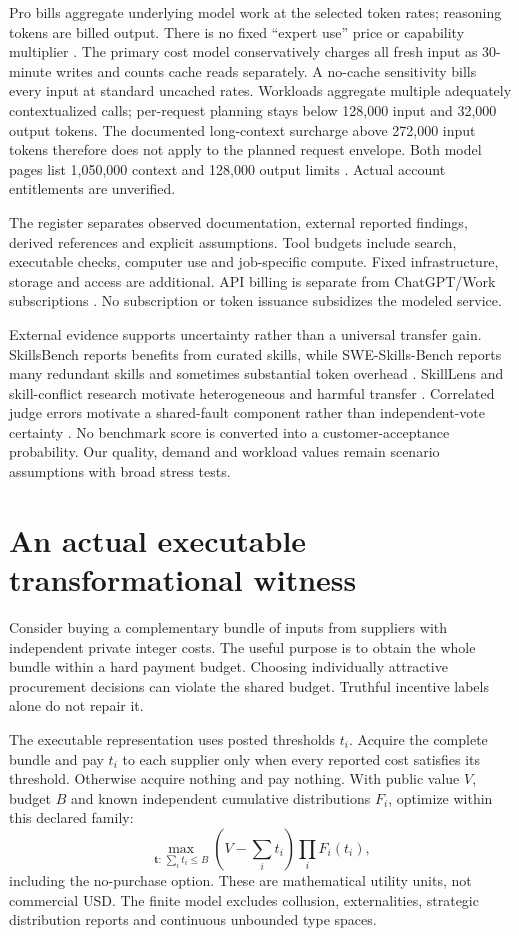 \documentclass[11pt,letterpaper]{article}
\begin{document}
Pro bills aggregate underlying model work at the selected token rates; reasoning
tokens are billed output. There is no fixed ``expert use'' price or capability
multiplier \citep{oai-reasoning,oai-pricing}. The primary cost model conservatively
charges all fresh input as 30-minute writes and counts cache reads separately.
A no-cache sensitivity bills every input at standard uncached rates. Workloads
aggregate multiple adequately contextualized calls; per-request planning stays
below 128,000 input and 32,000 output tokens. The documented long-context
surcharge above 272,000 input tokens therefore does not apply to the planned
request envelope. Both model pages list 1,050,000 context and 128,000 output
limits \citep{oai-astra,oai-terra}. Actual account entitlements are unverified.

The register separates observed documentation, external reported findings,
derived references and explicit assumptions. Tool budgets include search,
executable checks, computer use and job-specific compute. Fixed infrastructure,
storage and access are additional. API billing is separate from ChatGPT/Work
subscriptions \citep{oai-work}. No subscription or token issuance subsidizes the
modeled service.

External evidence supports uncertainty rather than a universal transfer gain.
SkillsBench reports benefits from curated skills, while SWE-Skills-Bench reports
many redundant skills and sometimes substantial token overhead
\citep{skillsbench,swe-skills}. SkillLens and skill-conflict research motivate
heterogeneous and harmful transfer \citep{skilllens,skill-conflict}. Correlated
judge errors motivate a shared-fault component rather than independent-vote
certainty \citep{judge-correlation}. No benchmark score is converted into a
customer-acceptance probability. Our quality, demand and workload values remain
scenario assumptions with broad stress tests.

\section{An actual executable transformational witness}

Consider buying a complementary bundle of inputs from suppliers with independent
private integer costs. The useful purpose is to obtain the whole bundle within a
hard payment budget. Choosing individually attractive procurement decisions can
violate the shared budget. Truthful incentive labels alone do not repair it.

The executable representation uses posted thresholds $t_i$. Acquire the complete
bundle and pay $t_i$ to each supplier only when every reported cost satisfies its
threshold. Otherwise acquire nothing and pay nothing. With public value $V$,
budget $B$ and known independent cumulative distributions $F_i$, optimize within
this declared family:
\begin{equation}
\max_{\mathbf t:\,\sum_i t_i\le B}
\left(V-\sum_i t_i\right)\prod_i F_i(t_i),
\label{eq:mechanism}
\end{equation}
including the no-purchase option. These are mathematical utility units, not
commercial USD. The finite model excludes collusion, externalities, strategic
distribution reports and continuous unbounded type spaces.
\end{document}
